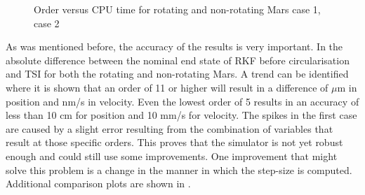 \begin{figure}[H]
\centering
{} 
\caption{Order versus CPU time for rotating and non-rotating Mars \protect{} case 1,  \protect{} case 2 } 
\label{fig:orderVsCPUcase1combined} 
\end{figure} 

As was mentioned before, the accuracy of  the results is very important. In  the absolute difference between the nominal end state of \ac{RKF} before circularisation and \ac{TSI} for both the rotating and non-rotating Mars. A trend can be identified where it is shown that an order of 11 or higher will result in a difference of $\mu$m in position and nm/s in velocity. Even the lowest order of 5 results in an accuracy of less than 10 cm for position and 10 mm/s for velocity. The spikes in the first case are caused by a slight error resulting from the combination of variables that result at those specific orders. This proves that the simulator is not yet robust enough and could still use some improvements. One improvement that might solve this problem is a change in the manner in which the step-size is computed. Additional comparison plots are shown in .

